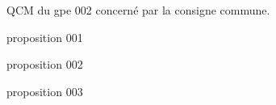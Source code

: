 \begin{exercice}\label{G1qcmgpe002Mark002}
    QCM du gpe 002 concerné par la consigne commune.
    \begin{ChoixQCM}{3}
    \item proposition 001
    \item proposition 002
    \item proposition 003
    \end{ChoixQCM}
\end{exercice}
\begin{corrige}
\end{corrige}
